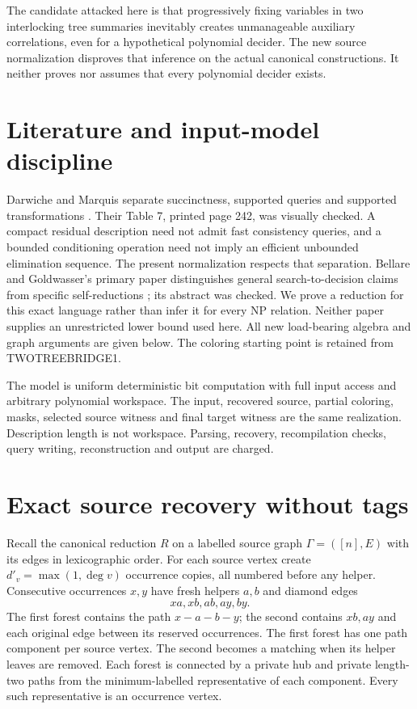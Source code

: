 \documentclass[11pt]{article}
\begin{document}
The candidate attacked here is that progressively fixing variables in two
interlocking tree summaries inevitably creates unmanageable auxiliary
correlations, even for a hypothetical polynomial decider. The new source
normalization disproves that inference on the actual canonical constructions.
It neither proves nor assumes that every polynomial decider exists.

\section{Literature and input-model discipline}
Darwiche and Marquis separate succinctness, supported queries and supported
transformations \cite{dm}. Their Table 7, printed page 242, was visually
checked. A compact residual description need not admit fast consistency
queries, and a bounded conditioning operation need not imply an efficient
unbounded elimination sequence. The present normalization respects that
separation. Bellare and Goldwasser's primary paper distinguishes general
search-to-decision claims from specific self-reductions \cite{bg}; its
abstract was checked. We prove a reduction for this exact language rather
than infer it for every NP relation. Neither paper supplies an unrestricted
lower bound used here. All new load-bearing algebra and graph arguments are
given below. The coloring starting point is retained from TWOTREEBRIDGE1.

The model is uniform deterministic bit computation with full input access
and arbitrary polynomial workspace. The input, recovered source, partial
coloring, masks, selected source witness and final target witness are the
same realization. Description length is not workspace. Parsing, recovery,
recompilation checks, query writing, reconstruction and output are charged.

\section{Exact source recovery without tags}
Recall the canonical reduction $R$ on a labelled source graph
$\Gamma=([n],E)$ with its edges in lexicographic order. For each source vertex
create $d'_v=\max(1,\deg v)$ occurrence copies, all numbered before any helper.
Consecutive occurrences $x,y$ have fresh helpers $a,b$ and diamond edges
\[
 xa,xb,ab,ay,by.
\]
The first forest contains the path $x-a-b-y$; the second contains $xb,ay$
and each original edge between its reserved occurrences. The first forest
has one path component per source vertex. The second becomes a matching
when its helper leaves are removed. Each forest is connected by a private
hub and private length-two paths from the minimum-labelled representative
of each component. Every such representative is an occurrence vertex.
\end{document}
